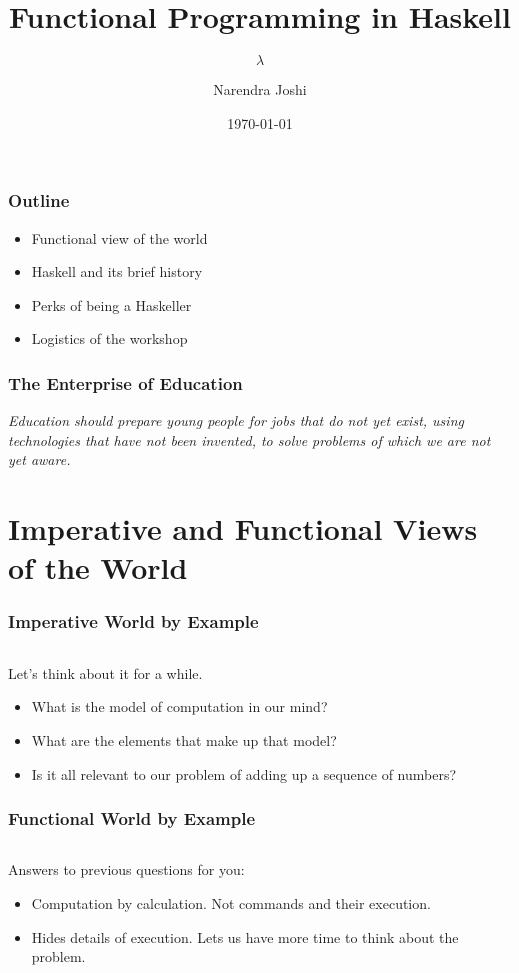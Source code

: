 \documentclass{beamer}
\title{Functional Programming in Haskell}
\subtitle{$\lambda$}
\author{Narendra Joshi}
\date{\today}
\begin{document}
\begin{frame}
  \titlepage
\end{frame}

\begin{frame}[t]
  \frametitle{Outline}

  \begin{itemize}
  \item{Functional view of the world}
  \item{Haskell and its brief history}
  \item{Perks of being a Haskeller}
  \item{Logistics of the workshop}
  \end{itemize}

\end{frame}

\begin{frame}[c]
  \frametitle{The Enterprise of Education}
  \begin{block}{}
    \emph{ Education should prepare young people for jobs that do not
      yet exist, using technologies that have not been invented,
      to solve problems of which we are not yet aware.}
  \end{block}
\end{frame}

\section{Imperative and Functional Views of the World}

\begin{frame}[fragile,t]
  \frametitle{Imperative World by Example}

  \inputminted[fontsize=\footnotesize,linenos=true]{c}{code/slides/sumfive.c}

  Let's think about it for a while.

  \begin{itemize}
  \item What is the model of computation in our mind?
  \item What are the elements that make up that model?
  \item Is it all relevant to our problem of adding up a sequence of numbers?
  \end{itemize}

\end{frame}

\begin{frame}[fragile,t]
  \frametitle{Functional World by Example}

  \inputminted[fontsize=\footnotesize,linenos=true]{haskell}{code/slides/SumFive.hs}

  Answers to previous questions for you:
  \begin{itemize}
  \item Computation by calculation. Not commands and their execution.
  \item Hides details of execution. Lets us have more time to think about the problem.
  \end{itemize}

\end{frame}
\end{document}
